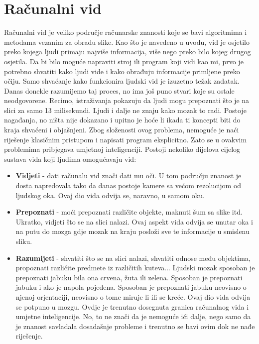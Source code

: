 \section{Računalni vid}
Računalni vid je veliko područje računarske znanosti koje se bavi algoritmima i metodama vezanim za obradu slike. Kao što je navedeno u uvodu, vid je osjetilo preko kojega ljudi primaju najviše informacija, više nego preko bilo kojeg drugog osjetila. Da bi bilo moguće napraviti stroj ili program koji vidi kao mi, prvo je potrebno shvatiti kako ljudi vide i kako obrađuju informacije primljene preko očiju. Samo shvaćanje kako funkcionira ljudski vid je izuzetno težak zadatak. Danas donekle razumijemo taj proces, no ima još puno stvari koje su ostale neodgovorene. Recimo, istraživanja pokazuju da ljudi mogu prepoznati što je na slici za samo 13 milisekundi\citep{RSVP13ms}. Ljudi i dalje ne znaju kako mozak to radi. Postoje nagađanja, no ništa nije dokazano i upitno je hoće li ikada ti koncepti biti do kraja shvaćeni i objašnjeni. Zbog složenosti ovog problema, nemoguće je naći riješenje klasičnim pristupom i napisati program eksplicitno. Zato se u ovakvim problemima pribjegava umjetnoj inteligenciji.
Postoji nekoliko dijelova cijelog sustava vida koji ljudima omogućavaju vid:
\begin{itemize}
\item{\textbf{Vidjeti}} - dati računalu vid znači dati mu oči. U tom području znanost je dosta napredovala tako da danas postoje kamere sa većom rezolucijom od ljudskog oka. Ovaj dio vida odvija se, naravno, u samom oku.
\item{\textbf{Prepoznati}} - moći prepoznati različite objekte, maknuti šum sa slike itd. Ukratko, vidjeti što se na slici nalazi. Ovaj aspekt vida odvija se unutar oka i na putu do mozga gdje mozak na kraju posloži sve te informacije u smislenu sliku.
\item{\textbf{Razumijeti}} - shvatiti što se na slici nalazi, shvatiti odnose među objektima, propoznati različite predmete iz različitih kuteva... Ljudski mozak sposoban je prepoznati jabuku bila ona crvena, žuta ili zelena. Sposoban je prepoznati jabuku i ako je napola pojedena. Sposoban je prepoznati jabuku neovisno o njenoj orjentaciji, neovisno o tome miruje li ili se kreće. Ovaj dio vida odvija se potpuno u mozgu. Ovdje je trenutno dosegnuta granica računalnog vida i umjetne inteligencije. No, to ne znači da je nemoguće ići dalje, nego samo da je znanost savladala dosadašnje probleme i trenutno se bavi ovim dok ne nađe riješenje. 
\end{itemize}
